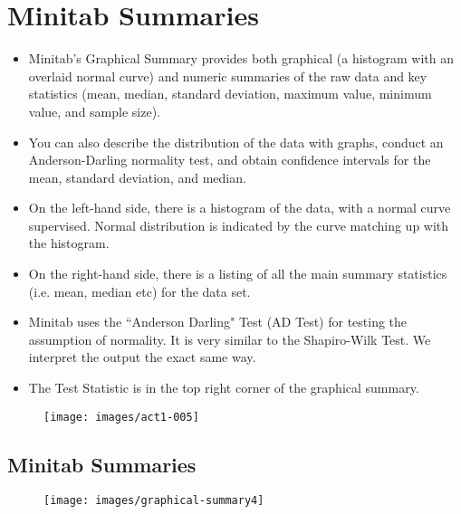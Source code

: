\documentclass[a4paper,12pt]{article}
\begin{document}
\section*{Minitab Summaries}
\begin{itemize}
\item Minitab’s Graphical Summary provides both graphical (a histogram with an overlaid normal curve) and numeric summaries of the raw data and key statistics (mean, median, standard deviation, maximum value, minimum value, and sample size).
\item You can also describe the distribution of the data with graphs, conduct an Anderson-Darling normality test, and obtain confidence intervals for the mean, standard deviation, and median.
\item On the left-hand side, there is a histogram of the data, with a normal curve supervised. Normal distribution is indicated by the curve matching up with the histogram.
\item On the right-hand side, there is a listing of all the main summary statistics (i.e. mean, median etc) for the data set.
	\item Minitab uses the ``Anderson Darling" Test (AD Test) for testing the assumption of normality. It is very similar to the Shapiro-Wilk Test. We interpret the output the exact same way.
	\item The Test Statistic is in the top right corner of the graphical summary.
	
	
\end{itemize}


\begin{figure}[h!]
	\centering
	\texttt{[image: images/act1-005]}
\end{figure}

\newpage

\subsection*{Minitab Summaries}
\begin{figure}[h!]
	\centering
	\texttt{[image: images/graphical-summary4]}
	
\end{figure}
\end{document}
